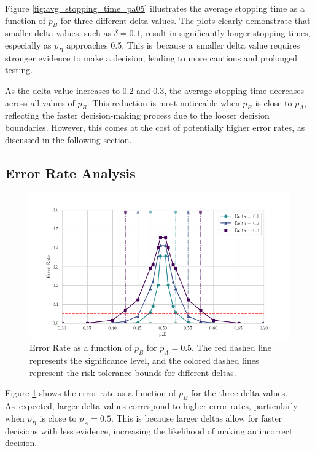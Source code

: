 \documentclass[magisterska, english]{pwr_wmat_praca_dyplomowa}
\theoremstyle{plain}
\numberwithin{theorem}{chapter}
\theoremstyle{definition}
\numberwithin{theorem}{chapter}
\begin{document}
Figure \ref{fig:avg_stopping_time_pa05} illustrates the average stopping time as a function of \( p_B \) for three different delta values. The plots clearly demonstrate that smaller delta values, such as \( \delta = 0.1 \), result in significantly longer stopping times, especially as \( p_B \) approaches 0.5. This is~because a~smaller delta value requires stronger evidence to make a decision, leading to more cautious and prolonged testing.

As the delta value increases to 0.2 and 0.3, the average stopping time decreases across all values of \( p_B \). This reduction is most noticeable when \( p_B \) is close to \( p_A \), reflecting the faster decision-making process due to the looser decision boundaries. However, this comes at the cost of potentially higher error rates, as discussed in the following section.

\subsection{Error Rate Analysis}

\begin{figure}[H]
	\centering
	\includegraphics[width=\textwidth]{images/delta_error_rate.png}
	\caption{Error Rate as a function of \( p_B \) for \( p_A = 0.5 \). The red dashed line represents the significance level, and the colored dashed lines represent the risk tolerance bounds for different deltas.}
	\label{fig:error_rate_pa05}
\end{figure}

Figure \ref{fig:error_rate_pa05} shows the error rate as a function of \( p_B \) for the three delta values. As~expected, larger delta values correspond to higher error rates, particularly when \( p_B \) is close to \( p_A = 0.5 \). This is because larger deltas allow for faster decisions with less evidence, increasing the likelihood of making an incorrect decision.
\end{document}
